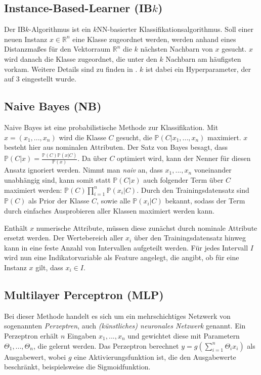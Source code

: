 \subsection{Instance-Based-Learner (IB$k$)}
Der IB$k$-Algorithmus ist ein $k$NN-basierter Klassifikationsalgorithmus. Soll einer neuen Instanz $x \in \mathbb{R}^n$ eine Klasse zugeordnet werden, werden anhand eines Distanzmaßes für den Vektorraum $\mathbb{R}^n$ die $k$ nächsten Nachbarn von $x$ gesucht. $x$ wird danach die Klasse zugeordnet, die unter den $k$ Nachbarn am häufigsten vorkam. Weitere Details sind zu finden in \cite{Aha1991}.
$k$ ist dabei ein Hyperparameter, der auf 3 eingestellt wurde.
\subsection{Naive Bayes (NB)}
Naive Bayes ist eine probabilistische Methode zur Klassifikation\cite{John1995}. Mit $x = (x_1, ..., x_n)$ wird die Klasse $C$ gesucht, die $\mathbb{P}(C | x_1, ..., x_n)$ maximiert. $x$ besteht hier aus nominalen Attributen. Der Satz von Bayes besagt, dass $\mathbb{P}(C|x) = \frac{\mathbb{P}(C) \mathbb{P}(x | C)}{\mathbb{P}(x)}$. Da über $C$ optimiert wird, kann der Nenner für diesen Ansatz ignoriert werden. Nimmt man \textit{naiv} an, dass $x_1, ..., x_n$ voneinander unabhängig sind, kann somit statt $\mathbb{P}(C | x)$ auch folgender Term über $C$ maximiert werden: $\mathbb{P}(C) \prod_{i=1}^{n} \mathbb{P}(x_i | C)$. Durch den Trainingsdatensatz sind $\mathbb{P}(C)$ als Prior der Klasse $C$, sowie alle $\mathbb{P}(x_i | C)$ bekannt, sodass der Term durch einfaches Ausprobieren aller Klassen maximiert werden kann.

Enthält $x$ numerische Attribute, müssen diese zunächst durch nominale Attribute ersetzt werden. Der Wertebereich aller $x_i$ über den Trainingsdatensatz hinweg kann in eine feste Anzahl von Intervallen aufgeteilt werden. Für jedes Intervall $I$ wird nun eine Indikatorvariable als Feature angelegt, die angibt, ob für eine Instanz $x$ gilt, dass $x_i \in I$.
\subsection{Multilayer Perceptron (MLP)}
Bei dieser Methode handelt es sich um ein mehrschichtiges Netzwerk von sogenannten \textit{Perzeptren}, auch \textit{(künstliches) neuronales Netzwerk} genannt. Ein Perzeptron erhält $n$ Eingaben $x_1, ..., x_n$ und gewichtet diese mit Parametern $\Theta_1, ..., \Theta_n$, die gelernt werden. Das Perzeptron berechnet $y = g(\sum_{i=1}^{n} \Theta_i x_i)$ als Ausgabewert, wobei $g$ eine Aktivierungsfunktion ist, die den Ausgabewerte beschränkt, beispielsweise die Sigmoidfunktion.

